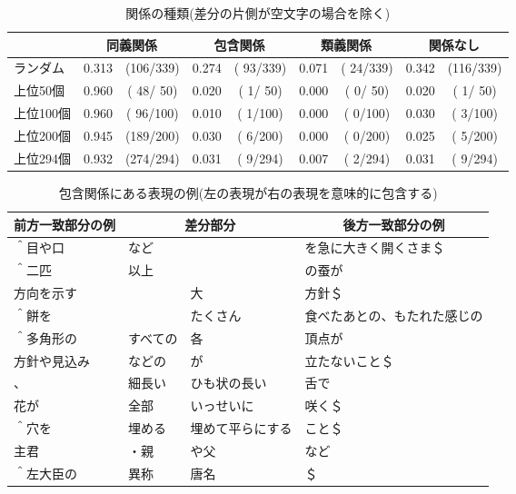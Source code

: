 \begin{table*}[t]
  \begin{center}
    \leavevmode
    \caption{関係の種類(差分の片側が空文字の場合を除く)}
    \label{tab:kankei2}
\begin{tabular}[h]{|l|r@{ }c|r@{ }c|r@{ }c|r@{ }c|}\hline
\multicolumn{1}{|c|}{} & \multicolumn{2}{|c|}{同義関係} & \multicolumn{2}{|c|}{包含関係} & \multicolumn{2}{|c|}{類義関係} & \multicolumn{2}{|c|}{関係なし} \\\hline
ランダム  & 0.313 & (106/339)& 0.274 & ( 93/339)& 0.071 & ( 24/339)& 0.342 & (116/339)\\\hline
上位50個 & 0.960 & ( 48/ 50)& 0.020 & (  1/ 50)& 0.000 & (  0/ 50)& 0.020 & (  1/ 50)\\
上位100個 & 0.960 & ( 96/100)& 0.010 & (  1/100)& 0.000 & (  0/100)& 0.030 & (  3/100)\\
上位200個 & 0.945 & (189/200)& 0.030 & (  6/200)& 0.000 & (  0/200)& 0.025 & (  5/200)\\
上位294個 & 0.932 & (274/294)& 0.031 & (  9/294)& 0.007 & (  2/294)& 0.031 & (  9/294)\\\hline
\end{tabular}
\end{center}
\end{table*}

\begin{table*}[t]
\small
  \begin{center}
    \leavevmode
    \caption{包含関係にある表現の例(左の表現が右の表現を意味的に包含する)}
    \label{tab:hougan_result}
\begin{tabular}[h]{|l|l|l|l|}\hline
\multicolumn{1}{|c|}{前方一致部分の例} & \multicolumn{2}{|c|}{差分部分} & \multicolumn{1}{|c|}{後方一致部分の例}\\\hline
＾目や口             & など       &            & を急に大きく開くさま＄\\
＾二匹               & 以上       &            & の蚕が              \\
方向を示す           &            & 大         & 方針＄              \\
＾餅を               &            & たくさん   & 食べたあとの、もたれた感じの\\
＾多角形の           & すべての   & 各         & 頂点が              \\
方針や見込み         & などの     & が         & 立たないこと＄      \\
、                   & 細長い     & ひも状の長い & 舌で                \\
花が                 & 全部       & いっせいに & 咲く＄              \\
＾穴を               & 埋める     & 埋めて平らにする  & こと＄              \\
主君                 & ・親       & や父       & など                \\
＾左大臣の           & 異称       & 唐名       & ＄                  \\\hline
\end{tabular}
  \end{center}
\end{table*}


